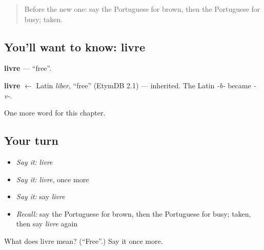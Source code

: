 \begin{quote}
Before the new one: say the Portuguese for brown, then the Portuguese for busy; taken.
\end{quote}

\subsection*{You'll want to know: livre}
\textbf{livre} — \textquotedblleft{}free\textquotedblright{}.

\begin{cousinweb}
\textbf{livre} $\leftarrow$ Latin \emph{liber}, \textquotedblleft{}free\textquotedblright{} (EtymDB 2.1) — inherited. The Latin \emph{-b-} became \emph{-v-}.
\end{cousinweb}

\begin{grammarlens}[title={What you've built}]
One more word for this chapter.
\end{grammarlens}

\subsection*{Your turn}
\begin{itemize}
\raggedright
  \item \emph{Say it:} \emph{livre}
  \item \emph{Say it:} \emph{livre}, once more
  \item \emph{Say it:} say \emph{livre}
  \item \emph{Recall:} say the Portuguese for brown, then the Portuguese for busy; taken, then say \emph{livre} again
\end{itemize}

\begin{tcolorbox}[breakable,colback=teal!4,colframe=teal!35!black,title={Before you move on}]
What does livre mean? (\textquotedblleft{}Free\textquotedblright{}.) Say it once more.
\end{tcolorbox}
